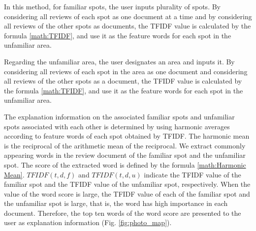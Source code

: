 \documentclass[journal]{IAENGtran}
\begin{document}
In this method, for familiar spots, the user inputs plurality of spots.
By considering all reviews of each spot as one document at a time and by considering all reviews of the other spots as documents, the TFIDF value is calculated by the formula \ref{math:TFIDF}, and use it as the feature words for each spot in the unfamiliar area.

Regarding the unfamiliar area, the user designates an area and inputs it.
By considering all reviews of each spot in the area as one document and considering all reviews of the other spots as a document, the TFIDF value is calculated by the formula \ref{math:TFIDF}, and use it as the feature words for each spot in the unfamiliar area.

The explanation information on the associated familiar spots and unfamiliar spots associated with each other is determined by using harmonic averages according to feature words of each spot obtained by TFIDF.
The harmonic mean is the reciprocal of the arithmetic mean of the reciprocal.
We extract commonly appearing words in the review document of the familiar spot and the unfamiliar spot.
The score of the extracted word is defined by the formula \ref{math:Harmonic Mean}.
$TFIDF(t,d,f)$ and $TFIDF(t,d,u)$ indicate the TFIDF value of the familiar spot and the TFIDF value of the unfamiliar spot, respectively.
When the value of the word score is large, the TFIDF value of each of the familiar spot and the unfamiliar spot is large, that is, the word has high importance in each document.
Therefore, the top ten words of the word score are presented to the user as explanation information (Fig. \ref{fig:photo_map}).
\end{document}
